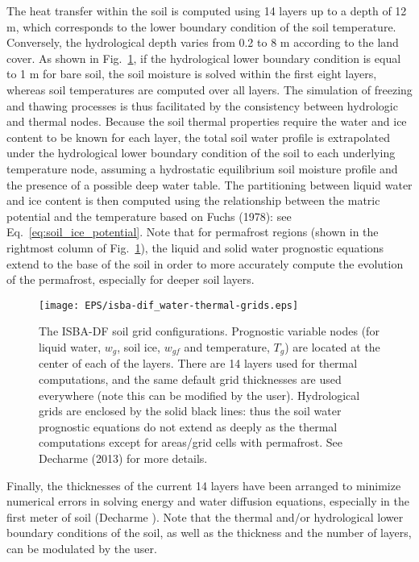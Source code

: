 The heat transfer within the soil is computed using 14
layers up to a depth of 12 m, which corresponds to the lower
boundary condition of the soil temperature. Conversely, the
hydrological depth varies from 0.2 to 8 m according to the
land cover. As shown in Fig.~\ref{fig:isba-dif_soil_grid}, 
if the hydrological
lower boundary condition is equal to 1 m for bare soil,
the soil moisture is solved within the first eight layers,
whereas soil temperatures are computed over all layers. The
simulation of freezing and thawing processes is thus facilitated 
by the consistency between hydrologic and thermal
nodes.
%
Because the soil thermal properties require the water and ice content
to be known for each layer, the total soil water profile is
extrapolated under the hydrological lower boundary condition
of the soil to each underlying temperature node, assuming
a hydrostatic equilibrium soil moisture profile and the presence of a
possible deep water table. The partitioning between liquid
water and ice content is then computed using the relationship
between the matric potential and the temperature based on
Fuchs \etal (1978): see Eq.~\ref{eq:soil_ice_potential}. 
Note that for permafrost regions
(shown in the rightmost column of Fig.~\ref{fig:isba-dif_soil_grid}), the
liquid and solid water prognostic equations extend to the base of the
soil in order to more accurately compute the evolution of the
permafrost, especially for deeper soil layers.

\begin{figure}[!b]
\centerline{ 
\texttt{[image: EPS/isba-dif\_water-thermal-grids.eps]}}
\caption{
The ISBA-DF soil grid configurations. Prognostic variable nodes (for
liquid water, $w_g$, soil ice, $w_{gf}$ and temperature, $T_g$) are located
at the center of each of the layers. There are 14 layers used for
thermal computations, and the same default 
grid thicknesses are used everywhere (note this can be modified by the
user). Hydrological grids are enclosed
by the solid black lines: thus the soil water prognostic equations do
not extend as deeply as the thermal computations except for areas/grid
cells with permafrost. See Decharme \etal (2013) for more details.
}
\label{fig:isba-dif_soil_grid}
\end{figure}

Finally, the thicknesses of the current 14 layers have
been arranged to minimize numerical errors in solving
energy and water diffusion equations, especially in the first
meter of soil (Decharme ). Note that the thermal
and/or hydrological lower boundary conditions of the soil,
as well as the thickness and the number of layers, can be
modulated by the user.


